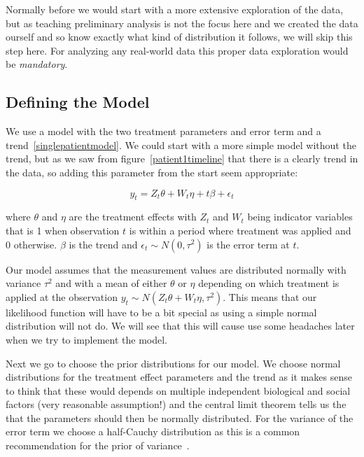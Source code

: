 \documentclass[12pt,a4paper,leqno]{report}
\theoremstyle{plain}
\theoremstyle{definition}
\theoremstyle{remark}
\begin{document}
Normally before we would start with a more extensive exploration of the data, but as teaching preliminary analysis
is not the focus here and we created the data ourself and so know exactly what kind
of distribution it follows, we will skip this step here. For analyzing any real-world data
this proper data exploration would be \emph{mandatory}.

\subsection{Defining the Model}

We use a model with the two treatment parameters and error term and a trend\ \ref{singlepatientmodel}. We could
start with a more simple model without the trend, but as we saw from figure\ \ref{patient1timeline}
that there is a clearly trend in the data, so adding this parameter from the start seem appropriate:

\begin{def}\label{}
    \begin{equation}\label{singlepatientmodel}
        y_t = Z_t\theta + W_t\eta + t\beta + \epsilon_t
    \end{equation}
\end{def} where \(\theta \) and \(\eta \) are the treatment effects with \(Z_t\) and \(W_t\) being indicator
variables that is 1 when observation \(t\) is within a period where treatment was applied and
0 otherwise. \(\beta \) is the trend and \(\epsilon_{t} \sim N(0,\tau^2) \) is the error term at \(t\).

Our model assumes that the measurement values are distributed normally with
variance \(\tau^2\) and with a mean of either \(\theta \) or \(\eta \) depending on which
treatment is applied at the observation \(y_t \sim N(Z_t\theta + W_t\eta, \tau^2)\).
This means that our likelihood function will have to be a bit special as using a simple
normal distribution will not do. We will see that this will cause use some headaches
later when we try to implement the model.

Next we go to choose the prior distributions for our model. We choose
normal distributions for the treatment effect parameters and the trend as it makes sense to think
that these would depends on multiple independent biological and social
factors (very reasonable assumption!) and the central limit theorem tells us the that
the parameters should then be normally distributed. For the variance of the error term we choose
a half-Cauchy distribution as this is a common recommendation for the prior of variance\
\cite{variancepriors}.
\end{document}
